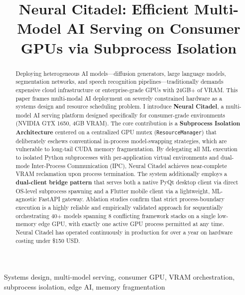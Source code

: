 \documentclass[conference]{IEEEtran}
\begin{document}
\title{Neural Citadel: Efficient Multi-Model AI Serving on Consumer GPUs via Subprocess Isolation}

\author{
}

\maketitle

\begin{abstract}
Deploying heterogeneous AI models---diffusion generators, large language models, segmentation networks, and speech recognition pipelines---traditionally demands expensive cloud infrastructure or enterprise-grade GPUs with 24GB+ of VRAM. This paper frames multi-modal AI deployment on severely constrained hardware as a systems design and resource scheduling problem. I introduce \textbf{Neural Citadel}, a multi-model AI serving platform designed specifically for consumer-grade environments (NVIDIA GTX 1650, 4GB VRAM). The core contribution is a \textbf{Subprocess Isolation Architecture} centered on a centralized GPU mutex (\texttt{ResourceManager}) that deliberately eschews conventional in-process model-swapping strategies, which are vulnerable to long-tail CUDA memory fragmentation. By delegating all ML execution to isolated Python subprocesses with per-application virtual environments and dual-mode Inter-Process Communication (IPC), Neural Citadel achieves near-complete VRAM reclamation upon process termination. The system additionally employs a \textbf{dual-client bridge pattern} that serves both a native PyQt desktop client via direct OS-level subprocess spawning and a Flutter mobile client via a lightweight, ML-agnostic FastAPI gateway. Ablation studies confirm that strict process-boundary execution is a highly reliable and empirically validated approach for sequentially orchestrating 40+ models spanning 8 conflicting framework stacks on a single low-memory edge GPU, with exactly one active GPU process permitted at any time. Neural Citadel has operated continuously in production for over a year on hardware costing under \$150 USD.
\end{abstract}

\begin{IEEEkeywords}
Systems design, multi-model serving, consumer GPU, VRAM orchestration, subprocess isolation, edge AI, memory fragmentation
\end{IEEEkeywords}
\end{document}
